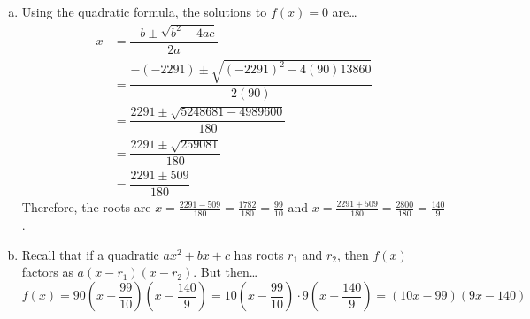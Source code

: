 \documentclass[12pt,letterpaper]{exam}
\begin{document}
\begin{questions}
\begin{enumerate}[(a)]
\item Using the quadratic formula, the solutions to $f(x)= 0$ are\dots
	\[
	\begin{aligned}
	x&= \dfrac{-b \pm \sqrt{b^2 - 4ac}}{2a} \\
	&= \dfrac{-(-2291) \pm \sqrt{(-2291)^2 - 4(90)13860}}{2(90)} \\
	&= \dfrac{2291 \pm \sqrt{5248681 - 4989600}}{180} \\
	&= \dfrac{2291 \pm \sqrt{259081}}{180} \\
	&= \dfrac{2291 \pm 509}{180}
	\end{aligned}
	\]
Therefore, the roots are $x= \frac{2291 - 509}{180}= \frac{1782}{180}= \frac{99}{10}$ and $x= \frac{2291 + 509}{180}= \frac{2800}{180}= \frac{140}{9}$. \pspace

\item Recall that if a quadratic $ax^2 + bx + c$ has roots $r_1$ and $r_2$, then $f(x)$ factors as $a(x - r_1)(x - r_2)$. But then\dots
	\[
	f(x)= 90 \left(x - \dfrac{99}{10} \right) \left(x - \dfrac{140}{9} \right)= 10 \left(x - \dfrac{99}{10} \right) \cdot 9 \left(x - \dfrac{140}{9} \right)= (10x - 99)(9x - 140)
	\]
\end{enumerate}


\end{questions}
\end{document}
